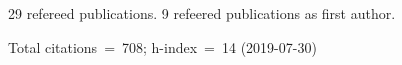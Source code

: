 29 refereed publications. 9 refeered publications as first author.

Total citations~=~708; h-index~=~14 (2019-07-30)